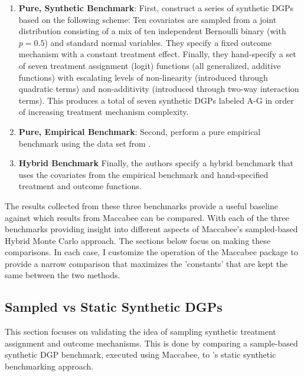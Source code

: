 \documentclass[../main.tex]{subfiles}
\begin{document}
\begin{enumerate}
    \item \textbf{Pure, Synthetic Benchmark}: First, \citeauthor{Diamond2012GeneticStudies} construct a series of synthetic DGPs based on the following scheme: Ten covariates are sampled from a joint distribution consisting of a mix of ten independent Bernoulli binary (with $p=0.5$) and standard normal variables. They specify a fixed outcome mechanism with a constant treatment effect. Finally, they hand-specify a set of seven treatment assignment (logit) functions (all generalized, additive functions) with escalating levels of non-linearity (introduced through quadratic terms) and non-additivity (introduced through two-way interaction terms). This produces a total of seven synthetic DGPs labeled A-G in order of increasing treatment mechanism complexity.
    
    \item \textbf{Pure, Empirical Benchmark}: Second, \citeauthor{Diamond2012GeneticStudies} perform a pure empirical benchmark using the data set from \textcite{Lalonde1986EvaluatingData}.
    
    \item \textbf{Hybrid Benchmark} Finally, the authors specify a hybrid benchmark that uses the covariates from the \textcite{Lalonde1986EvaluatingData} empirical benchmark and hand-specified treatment and outcome functions.
\end{enumerate}

The results collected from these three benchmarks provide a useful baseline against which results from Maccabee can be compared. With each of the three benchmarks providing insight into different aspects of Maccabee's sampled-based Hybrid Monte Carlo approach. The sections below focus on making these comparisons. In each case, I customize the operation of the Maccabee package to provide a narrow comparison that maximizes the 'constants' that are kept the same between the two methods.

\subsection{Sampled vs Static Synthetic DGPs}

This section focuses on validating the idea of sampling synthetic treatment assignment and outcome mechanisms. This is done by comparing a sample-based synthetic DGP benchmark, executed using Maccabee, to \citeauthor{Diamond2012GeneticStudies}'s static synthetic benchmarking approach. 
\end{document}
